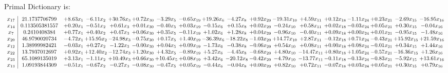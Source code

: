 \documentclass[9pt]{article}
\begin{document}
Primal Dictionary is:
\[\begin{array}{c| c c@{\hskip 2pt} c@{\hskip 2pt} c@{\hskip 2pt} c@{\hskip 2pt} c@{\hskip 2pt} c@{\hskip 2pt} c@{\hskip 2pt} c@{\hskip 2pt} c@{\hskip 2pt} c@{\hskip 2pt} c@{\hskip 2pt} c@{\hskip 2pt} c@{\hskip 2pt} c@{\hskip 2pt} c@{\hskip 2pt} c@{\hskip 2pt} }
 x_{17}   &  21.1737706799 & +  8.63 x_{1} & -6.11 x_{2} & + 30.76 x_{3} & +  0.72 x_{30} & -3.29 x_{5} & -0.65 x_{19} & + 19.26 x_{6} & -4.27 x_{8} & +  0.92 x_{29} & -19.31 x_{10} & +  4.59 x_{11} & +  0.12 x_{18} & -1.11 x_{24} & +  0.23 x_{21} & -2.69 x_{15} & -16.95 x_{16}\\
 x_{14}   &  0.113505381557 & +  0.20 x_{1} & -0.51 x_{2} & +  0.61 x_{3} & +  0.01 x_{30} & -0.40 x_{5} & +  0.03 x_{19} & -0.15 x_{6} & +  0.15 x_{8} & +  0.02 x_{29} & -0.24 x_{10} & +  0.58 x_{11} & +  0.02 x_{18} & -0.03 x_{24} & +  0.05 x_{21} & +  0.30 x_{15} & -0.04 x_{16}\\
 x_{7}   &  0.2410408384 & +  0.77 x_{1} & +  0.40 x_{2} & +  0.47 x_{3} & +  0.06 x_{30} & +  0.35 x_{5} & -0.11 x_{19} & +  1.02 x_{6} & +  1.28 x_{8} & +  0.04 x_{29} & -0.96 x_{10} & -0.40 x_{11} & +  0.09 x_{18} & +  0.00 x_{24} & +  0.01 x_{21} & -0.95 x_{15} & -1.48 x_{16}\\
 x_{20}   &  46.9790020734 & -4.72 x_{1} & + 15.95 x_{2} & -24.98 x_{3} & -0.75 x_{30} & +  0.17 x_{5} & +  1.40 x_{19} & -36.39 x_{6} & -18.22 x_{8} & -1.03 x_{29} & + 14.77 x_{10} & +  2.87 x_{11} & -0.12 x_{18} & +  0.71 x_{24} & -0.43 x_{21} & + 15.92 x_{15} & + 21.59 x_{16}\\
 x_{12}   &  1.38999982421 & -0.03 x_{1} & +  0.27 x_{2} & -1.22 x_{3} & -0.00 x_{30} & +  0.04 x_{5} & +  0.09 x_{19} & -1.73 x_{6} & -0.38 x_{8} & -0.06 x_{29} & +  0.54 x_{10} & +  0.08 x_{11} & +  0.00 x_{18} & +  0.08 x_{24} & -0.01 x_{21} & +  0.34 x_{15} & +  1.44 x_{16}\\
 x_{22}   &  13.7937012697 & +  0.92 x_{1} & + 12.40 x_{2} & -12.74 x_{3} & +  1.20 x_{30} & +  4.32 x_{5} & -0.89 x_{19} & +  5.27 x_{6} & -4.45 x_{8} & -0.68 x_{29} & +  4.80 x_{10} & -14.47 x_{11} & +  0.80 x_{18} & +  1.05 x_{24} & -0.57 x_{21} & -16.36 x_{15} & +  1.26 x_{16}\\
 x_{23}   &  65.1089135019 & +  3.13 x_{1} & -1.11 x_{2} & + 10.49 x_{3} & +  0.66 x_{30} & + 10.45 x_{5} & +  0.08 x_{19} & +  3.42 x_{6} & -20.12 x_{8} & -0.42 x_{29} & -4.79 x_{10} & -13.77 x_{11} & -0.11 x_{18} & -0.13 x_{24} & -0.83 x_{21} & -5.92 x_{15} & + 13.61 x_{16}\\
 x_{13}   &  1.09193844309 & -0.51 x_{1} & -0.67 x_{2} & -0.27 x_{3} & -0.08 x_{30} & -0.47 x_{5} & +  0.05 x_{19} & -0.44 x_{6} & -0.04 x_{8} & +  0.00 x_{29} & +  0.82 x_{10} & +  0.72 x_{11} & -0.07 x_{18} & +  0.03 x_{24} & +  0.05 x_{21} & +  0.30 x_{15} & +  0.79 x_{16}\\

\end{array}\]
\end{document}
